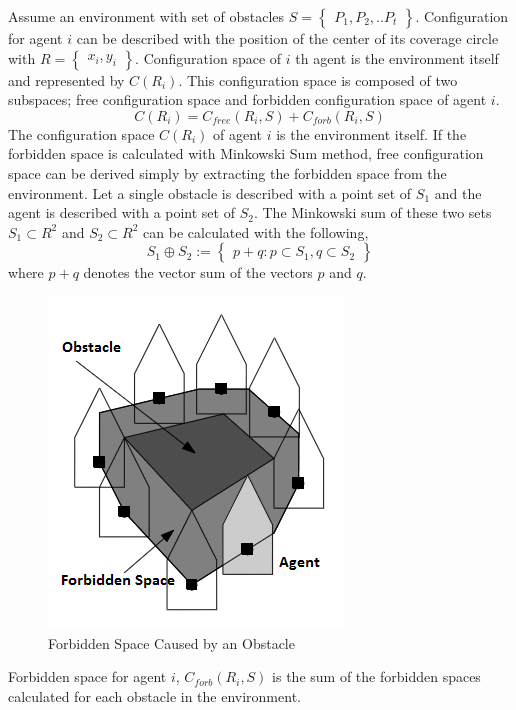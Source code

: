 \documentclass[twoside]{article}
\begin{document}
	Assume an environment with set of obstacles $S = \begin{Bmatrix}
	P_1, P_2, .. P_t \end{Bmatrix}$. Configuration for agent $i$ can be described with the position of the center of its coverage circle with $R=\begin{Bmatrix}x_i, y_i\end{Bmatrix}$. Configuration space of $i$ th agent is the environment itself and represented by $C(R_i)$. This configuration space is composed of two subspaces; free configuration space and forbidden configuration space of agent $i$.
	\begin{equation}
	C(R_i) = C_{free}(R_i,S) + C_{forb}(R_i,S)
	\end{equation}
	The configuration space $C(R_i)$ of agent $i$ is the environment itself. If the forbidden space is calculated with Minkowski Sum method, free configuration space can be derived simply by extracting the forbidden space from the environment. Let a single obstacle is described with a point set of $S_1$ and the agent is described with a point set of $S_2$. The Minkowski sum of these two sets $S_1 \subset R^2$ and $S_2 \subset R^2$ can be calculated with the following,
	\begin{equation}
	S_1 \oplus S_2 := \begin{Bmatrix}
	p+q : p \subset S_1, q \subset S_2
	\end{Bmatrix} 
	\end{equation}
	where $p+q$ denotes the vector sum of the vectors $p$ and $q$.
	
	
	\begin{figure}[H]
		\caption{Forbidden Space Caused by an Obstacle}
		\centering
		\includegraphics[scale = 0.4]{Forbidden}
	\end{figure}
	Forbidden space for agent $i$, $C_{forb}(R_i, S)$ is the sum of the forbidden spaces calculated for each obstacle in the environment. 
	
\end{document}

